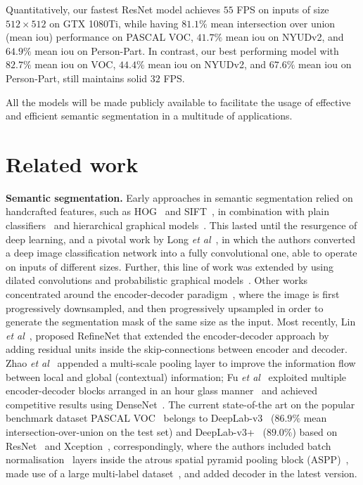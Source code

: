 \documentclass{bmvc2k}
\def\etal{\emph{et al}\bmvaOneDot}
\begin{document}
Quantitatively, our fastest ResNet model achieves $55$ FPS on inputs of size $512\times512$ on GTX 1080Ti, while having $81.1\%$ mean intersection over union (mean iou) performance on PASCAL VOC, $41.7\%$ mean iou on NYUDv2, and $64.9\%$ mean iou on Person-Part. In contrast, our best performing model with $82.7\%$ mean iou on VOC, $44.4\%$ mean iou on NYUDv2, and $67.6\%$ mean iou on Person-Part, still maintains solid $32$ FPS.\par
	All the models will be made publicly available to facilitate the usage of effective and efficient semantic segmentation in a multitude of applications.
\vspace{-0.12in}

\section{Related work}
\vskip -0.1in
\textbf{Semantic segmentation.} Early approaches in semantic segmentation relied on handcrafted features, such as HOG~\cite{DalalT05} and SIFT~\cite{Lowe04}, in combination with plain classifiers~\cite{ShottonWRC06,CsurkaP08,ShottonJC08,FulkersonVS09} and hierarchical graphical models~\cite{LadickyRKT09,PlathTN09,KrahenbuhlK11}. This lasted until the resurgence of deep learning, and a pivotal work by Long \etal~\cite{LongSD15}, in which the authors converted a deep image classification network into a fully convolutional one, able to operate on inputs of different sizes. Further, this line of work was extended by using dilated convolutions and probabilistic graphical models~\cite{ChenPKMY14,YuKF17,LinSRH15,LiuLLLT15,ZhengJRVSDHT15}. Other works concentrated around the encoder-decoder paradigm~\cite{LinMSR17,PaszkeCKC16,NohHH15}, where the image is first progressively downsampled, and then progressively upsampled in order to generate the segmentation mask of the same size as the input. Most recently, Lin \etal~\cite{LinMSR17}, proposed RefineNet that extended the encoder-decoder approach by adding residual units inside the skip-connections between encoder and decoder. Zhao \etal~\cite{ZhaoSQWJ17} appended a multi-scale pooling layer to improve the information flow between local and global (contextual) information; Fu \etal~\cite{abs-1708-04943} exploited multiple encoder-decoder blocks arranged in an hour glass manner~\cite{YangLZ17} and achieved competitive results using DenseNet~\cite{HuangLMW17}. The current state-of-the art on the popular benchmark dataset PASCAL VOC~\cite{EveringhamGWWZ10} belongs to DeepLab-v3~\cite{ChenPSA17} ($86.9\%$ mean intersection-over-union on the test set) and DeepLab-v3+~\cite{abs-1802-02611} ($89.0\%$) based on ResNet~\cite{HeZRS16} and Xception~\cite{Chollet17}, correspondingly, where the authors included batch normalisation~\cite{IoffeS15} layers inside the atrous spatial pyramid pooling block (ASPP)~\cite{ChenPK0Y16}, made use of a large multi-label dataset~\cite{SunSSG17}, and added decoder in the latest version.\\
\end{document}

